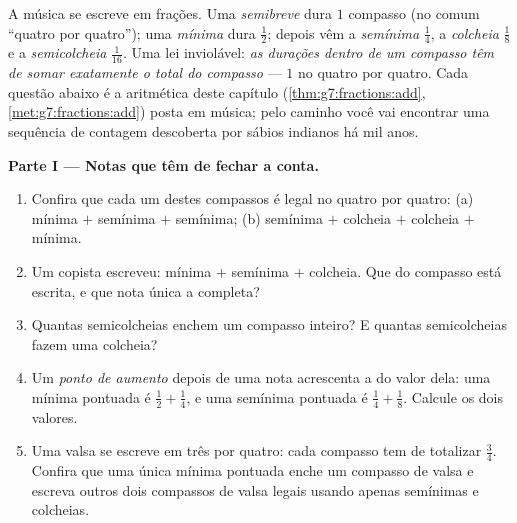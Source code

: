 \begin{problem}
\label{pb:g7:fractions:1}
A música se escreve em frações. Uma \emph{semibreve} dura $1$ compasso
(no comum ``quatro por quatro''); uma \emph{mínima} dura $\frac12$;
depois vêm a \emph{semínima} $\frac14$, a \emph{colcheia} $\frac18$ e a
\emph{semicolcheia} $\frac{1}{16}$. Uma lei inviolável: \emph{as
durações dentro de um compasso têm de somar exatamente o total do
compasso} --- $1$ no quatro por quatro. Cada questão abaixo é a
aritmética deste capítulo (\cref{thm:g7:fractions:add},
\cref{met:g7:fractions:add}) posta em música; pelo caminho você vai
encontrar uma sequência de contagem descoberta por sábios indianos há
mil anos.

\medskip
\noindent\textbf{Parte I --- Notas que têm de fechar a conta.}
\begin{enumerate}
  \item Confira que cada um destes compassos é legal no quatro por
        quatro: (a) mínima $+$ semínima $+$ semínima; (b) semínima $+$
        colcheia $+$ colcheia $+$ mínima.
  \item Um copista escreveu: mínima $+$ semínima $+$ colcheia. Que
         do compasso está escrita, e que nota única a completa?
  \item Quantas semicolcheias enchem um compasso inteiro? E quantas
        semicolcheias fazem uma colcheia?
  \item Um \emph{ponto de aumento} depois de uma nota acrescenta a
         do valor dela: uma mínima pontuada é $\frac12 +
        \frac14$, e uma semínima pontuada é $\frac14 + \frac18$.
        Calcule os dois valores.
  \item Uma valsa se escreve em três por quatro: cada compasso tem de
        totalizar $\frac34$. Confira que uma única mínima pontuada
        enche um compasso de valsa e escreva outros dois compassos de
        valsa legais usando apenas semínimas e colcheias.
\end{enumerate}


\end{problem}
